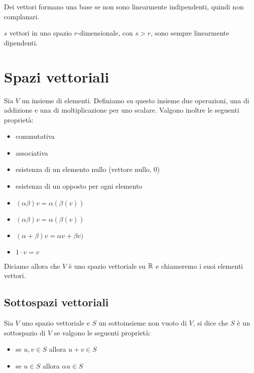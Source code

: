 \begin{definition}
Dei vettori formano una base se non sono linearmente indipendenti, quindi non complanari.
\end{definition}

\begin{property}
$s$ vettori in uno spazio $r$-dimensionale, con $s>r$, sono sempre linearmente dipendenti.
\end{property}


\section{Spazi vettoriali}

\begin{definition}
Sia $V$ un insieme di elementi. Definiamo su questo insieme due operazioni, una di addizione e una di moltiplicazione per uno scalare. Valgono inoltre le seguenti proprietà:
\begin{itemize}
\item commutativa
\item associativa
\item esistenza di un elemento nullo (vettore nullo, 0)
\item esistenza di un opposto per ogni elemento
\item $(\alpha\beta)v = \alpha(\beta(v))$
\item $(\alpha\beta)v = \alpha(\beta(v))$
\item $(\alpha+\beta)v = \alpha v + \beta v)$
\item $1 \cdot v = v$
\end{itemize}
Diciamo allora che $V$ è uno spazio vettoriale su $\mathbb{R}$ e chiameremo i suoi elementi vettori.
\end{definition}

\subsection{Sottospazi vettoriali}

\begin{definition}
Sia $V$ uno spazio vettoriale e $S$ un sottoinsieme non vuoto di $V$, si dice che $S$ è un sottospazio di $V$ se valgono le seguenti proprietà:
\begin{itemize}
\item se $u,v \in S$ allora $u+v \in S$
\item se $u \in S$ allora $\alpha u \in S$
\end{itemize}
\end{definition}

